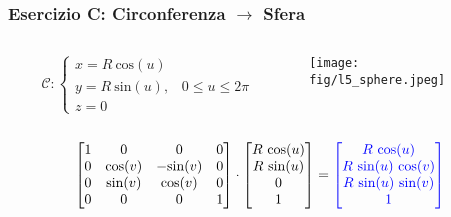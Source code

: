 \documentclass{beamer}
\newcommand{\fig}{./figures} %
\newcommand{\msin}{\mbox{sin}} %
\newcommand{\mcos}{\mbox{cos}} %
\begin{document}
\begin{frame}
\frametitle{Esercizio C: Circonferenza $\rightarrow$ Sfera}
\begin{columns}
\begin{column}{0.58\textwidth}
\begin{displaymath}
\mathcal{C}:
\begin{cases}
x = R~\mcos(u)\\
y = R~\msin(u), \;\;\;0\le u\le 2\pi\\
z = 0
\end{cases}
\end{displaymath}
\end{column}
\begin{column}{0.39\textwidth}
\texttt{[image: \\fig/l5\_sphere.jpeg]}

\end{column}
\end{columns}
%
\vspace{0.1\textheight}
\begin{displaymath}
\begin{bmatrix}
1 & 0 & 0 & 0\\
0 & \mcos(v) & -\msin(v) & 0\\
0 & \msin(v)   & \mcos(v) & 0\\
0 & 0   & 0 & 1
\end{bmatrix}
\cdot
\begin{bmatrix}
R~\mcos(u)\\
R~\msin(u)\\
0\\
1
\end{bmatrix}
= 
{\color{blue}
\begin{bmatrix}
R ~\mcos(u)\\
R ~\msin(u)~\mcos(v)\\
R ~\msin(u)~\msin(v)\\
1
\end{bmatrix}
}
\end{displaymath}
\end{frame}
\end{document}
